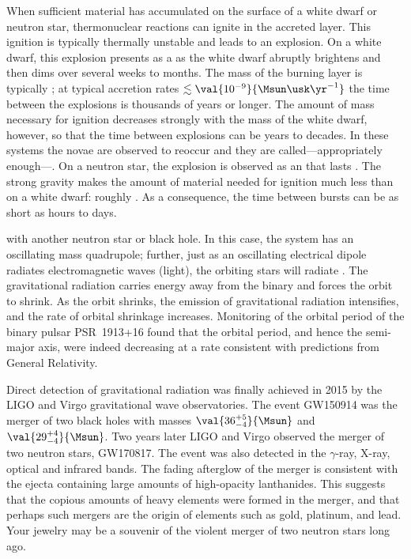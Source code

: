 When sufficient material has accumulated on the surface of a white dwarf or neutron star, thermonuclear reactions can ignite in the accreted layer. This ignition is typically thermally unstable and leads to an explosion. On a white dwarf, this explosion presents as a  as the white dwarf abruptly brightens and then dims over several weeks to months. The mass of the burning layer is typically ; at typical accretion rates $\lesssim\val{10^{-9}}{\Msun\usk\yr^{-1}}$ the time between the explosions is thousands of years or longer. The amount of mass necessary for ignition decreases strongly with the mass of the white dwarf, however, so that the time between explosions can be years to decades. In these systems the novae are observed to reoccur and they are called---appropriately enough---.
On a neutron star, the explosion is observed as an  that lasts . The strong gravity makes the amount of material needed for ignition much less than on a white dwarf: roughly . As a consequence, the time between bursts can be as short as hours to days. 

 with another neutron star or black hole. In this case, the system has an oscillating mass quadrupole; further, just as an oscillating electrical dipole radiates electromagnetic waves (light), the orbiting stars will radiate . The gravitational radiation carries energy away from the binary and forces the orbit to shrink. As the orbit shrinks, the emission of gravitational radiation intensifies, and the rate of orbital shrinkage increases. Monitoring of the orbital period of the binary pulsar PSR~1913+16\cite{Hulse1975Discovery-of-a-} found that the orbital period, and hence the semi-major axis, were indeed decreasing at a rate consistent with predictions from General Relativity\cite{Taylor1982A-new-test-of-g}.

Direct detection of gravitational radiation was finally achieved in 2015 by the LIGO and Virgo gravitational wave observatories. The event GW150914 was the merger of two black holes with masses $\val{36_{-4}^{+5}}{\Msun}$ and $\val{29_{-4}^{+4}}{\Msun}$\cite{Abbott2016Observation-of-}. Two years later LIGO and Virgo observed the merger of two neutron stars, GW170817\cite{Abbott2017GW170817:-Obser}. The event was also detected in the $\gamma$-ray, X-ray, optical and infrared bands\cite{Abbott2017Multi-messenger}. The fading afterglow of the merger is consistent with the ejecta containing large amounts of high-opacity lanthanides. This suggests that the copious amounts of heavy elements were formed in the merger, and that perhaps such mergers are the origin of elements such as gold, platinum, and lead.  Your jewelry may be a souvenir of the violent merger of two neutron stars long ago.
